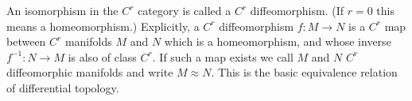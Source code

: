 An isomorphism in the $C^r$ category is called a $C^r$ diffeomorphism. (If $r = 0$ this means a homeomorphism.) Explicitly, a $C^r$ diffeomorphism $f: M \to N$ is a $C^r$ map between $C^r$ manifolds $M$ and $N$ which is a homeomorphism, and whose inverse $f^{-1}: N \to M$ is also of class $C^r$. If such a map exists we call $M$ and $N$ $C^r$ diffeomorphic manifolds and write $M \approx N$. This is the basic equivalence relation of differential topology.
